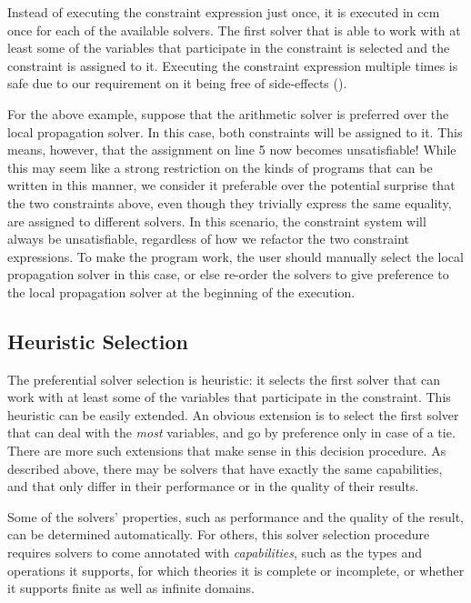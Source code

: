 Instead of executing the constraint expression just once, it is
executed in \gls{ccm} once for each of the available solvers. The
first solver that is able to work with at least some of the variables
that participate in the constraint is selected and the constraint is
assigned to it. Executing the constraint expression multiple times is
safe due to our requirement on it being free of side-effects
().

For the above example, suppose that the arithmetic solver is preferred
over the local propagation solver. In this case, both constraints will
be assigned to it. This means, however, that the assignment on line 5
now becomes unsatisfiable! While this may seem like a strong
restriction on the kinds of programs that can be written in this
manner, we consider it preferable over the potential surprise that the
two constraints above, even though they trivially express the same
equality, are assigned to different solvers. In this scenario, the
constraint system will always be unsatisfiable, regardless of how we
refactor the two constraint expressions. To make the program work, the
user should manually select the local propagation solver in this case,
or else re-order the solvers to give preference to the local
propagation solver at the beginning of the execution.

\subsection{Heuristic Selection}
\label{sec:heuristic-solv-select}
The preferential solver selection is heuristic: it selects the first
solver that can work with at least some of the variables that
participate in the constraint. This heuristic can be easily
extended. An obvious extension is to select the first solver that can
deal with the \emph{most} variables, and go by preference only in case
of a tie. There are more such extensions that make sense in this
decision procedure. As described above, there may be solvers that have
exactly the same capabilities, and that only differ in their
performance or in the quality of their results.

Some of the solvers' properties, such as performance and the quality of the
result, can be determined automatically. For others, this solver selection
procedure requires solvers to come annotated with \emph{capabilities}, such as
the types and operations it supports, for which theories it is complete or
incomplete, or whether it supports finite as well as infinite domains.

